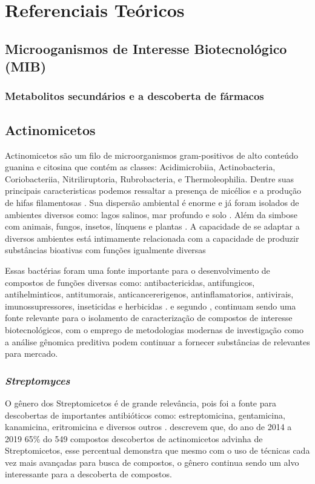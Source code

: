\chapter{Referenciais Teóricos}
\label{cap:referenciais_teoricos}

\section{Microoganismos de Interesse Biotecnológico (MIB)}

\subsection{Metabolitos secundários e a descoberta de fármacos}

\section{Actinomicetos}
Actinomicetos são um filo de microorganismos gram-positivos de alto conteúdo
guanina e citosina que contém as classes: Acidimicrobiia, Actinobacteria, 
Coriobacteriia, Nitriliruptoria, Rubrobacteria, e Thermoleophilia\cite{yadav2018}.
Dentre suas principais caracteristicas podemos ressaltar a presença de micélios
e a produção de hifas filamentosas \cite{chater2016}. Sua dispersão ambiental é enorme
e já foram isolados de ambientes diversos como: lagos salinos, mar profundo e solo \cite{flores2021,felicio2021,sapkota2020}.
Além da simbose com animais, fungos, insetos, línquens e plantas \cite{hei2021,van2017}.
A capacidade de se adaptar a diversos ambientes está intimamente relacionada com a capacidade
de produzir substâncias bioativas com funções igualmente diversas  \cite{van2020}

Essas bactérias foram uma fonte importante para o desenvolvimento de compostos de funções
diversas como: antibactericidas, antifungicos, antihelminticos, antitumorais, anticancererigenos,
antinflamatorios, antivirais, imunossupressores, inseticidas e herbicidas \cite{demain2009,jose2021}.
e segundo , continuam sendo uma fonte relevante
para o isolamento de caracterização de compostos de interesse biotecnológicos, com o
emprego de metodologias modernas de investigação como a análise gênomica preditiva
podem continuar a fornecer substâncias de relevantes para mercado.

\subsection{\textit{Streptomyces}}
O gênero dos Streptomicetos é de grande relevância, pois foi a fonte para descobertas de importantes antibióticos 
como: estreptomicina, gentamicina, kanamicina, eritromicina e diversos outros \cite{demain2009}.
 descrevem que, do ano de 2014 a 2019 65\% do 549 compostos descobertos
de actinomicetos advinha de Streptomicetos, esse percentual demonstra que mesmo com o uso de técnicas
cada vez mais avançadas para busca de compostos, o gênero continua sendo um alvo interessante
para a descoberta de compostos. 



